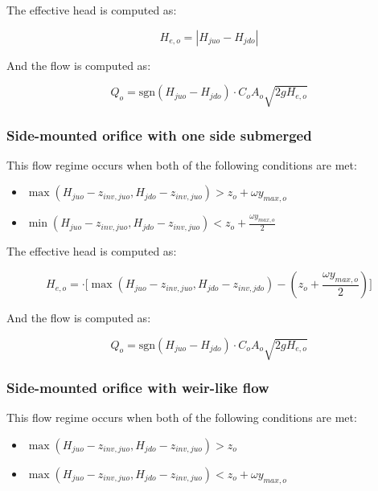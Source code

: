 \documentclass[11pt]{article}
\begin{document}
The effective head is computed as:

\begin{equation}
  H_{e,o} = | H_{juo} - H_{jdo} |
\end{equation}

And the flow is computed as:

\begin{equation}
 Q_o = \text{sgn}(H_{juo} - H_{jdo}) \cdot C_o A_o \sqrt{2 g H_{e,o}} 
\end{equation}

\subsubsection*{Side-mounted orifice with one side submerged}

This flow regime occurs when both of the following conditions are met:

\begin{itemize}
\item $\max(H_{juo} - z_{inv,juo}, H_{jdo} - z_{inv,juo}) > z_o + \omega y_{max,o}$
\item $\min(H_{juo} - z_{inv,juo}, H_{jdo} - z_{inv,juo}) < z_o + \frac{\omega y_{max,o}}{2}$
\end{itemize}

The effective head is computed as:

\begin{equation}
  H_{e,o} = \cdot \bigl[ \max(H_{juo} - z_{inv,juo}, H_{jdo} - z_{inv,jdo}) - (z_o + \frac{\omega y_{max,o}}{2}) \bigr]
\end{equation}

And the flow is computed as:

\begin{equation}
 Q_o = \text{sgn}(H_{juo} - H_{jdo}) \cdot C_o A_o \sqrt{2 g H_{e,o}} 
\end{equation}

\subsubsection*{Side-mounted orifice with weir-like flow}

This flow regime occurs when both of the following conditions are met:

\begin{itemize}
\item $\max(H_{juo} - z_{inv,juo}, H_{jdo} - z_{inv,juo}) > z_o$
\item $\max(H_{juo} - z_{inv,juo}, H_{jdo} - z_{inv,juo}) < z_o + \omega y_{max,o}$
\end{itemize}
\end{document}
